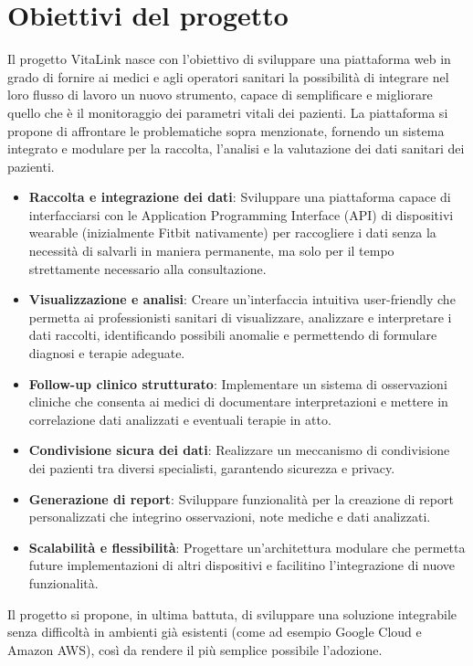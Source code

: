 \documentclass[12pt,a4paper,oneside]{report}
\begin{document}
\section{Obiettivi del progetto}
Il progetto VitaLink nasce con l'obiettivo di sviluppare una piattaforma web in grado di fornire ai medici e agli operatori sanitari la possibilità di integrare nel loro flusso di lavoro un nuovo strumento, capace di semplificare e migliorare quello che è il monitoraggio dei parametri vitali dei pazienti.
La piattaforma si propone di affrontare le problematiche sopra menzionate, fornendo un sistema integrato e modulare per la raccolta, l'analisi e la valutazione dei dati sanitari dei pazienti.

\begin{itemize}
  \item \textbf{Raccolta e integrazione dei dati}: Sviluppare una piattaforma capace di interfacciarsi con le Application Programming Interface (API) di dispositivi wearable (inizialmente Fitbit nativamente) per raccogliere i dati senza la necessità di salvarli in maniera permanente, ma solo per il tempo strettamente necessario alla consultazione.
    \item \textbf{Visualizzazione e analisi}: Creare un'interfaccia intuitiva user-friendly che permetta ai professionisti sanitari di visualizzare, analizzare e interpretare i dati raccolti, identificando possibili anomalie e permettendo di formulare diagnosi e terapie adeguate.
    \item \textbf{Follow-up clinico strutturato}: Implementare un sistema di osservazioni cliniche che consenta ai medici di documentare interpretazioni e mettere in correlazione dati analizzati e eventuali terapie in atto.
    \item \textbf{Condivisione sicura dei dati}: Realizzare un meccanismo di condivisione dei pazienti tra diversi specialisti, garantendo sicurezza e privacy.
    \item \textbf{Generazione di report}: Sviluppare funzionalità per la creazione di report personalizzati che integrino osservazioni, note mediche e dati analizzati.
    \item \textbf{Scalabilità e flessibilità}: Progettare un'architettura modulare che permetta future implementazioni di altri dispositivi e facilitino l'integrazione di nuove funzionalità.
\end{itemize}

Il progetto si propone, in ultima battuta, di sviluppare una soluzione integrabile senza difficoltà in ambienti già esistenti (come ad esempio Google Cloud e Amazon AWS), così da rendere il più semplice possibile l'adozione.
\end{document}

